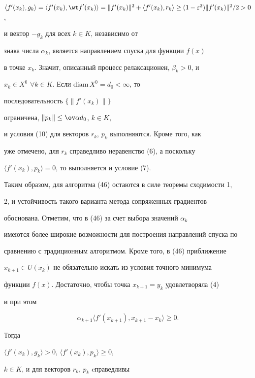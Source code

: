 $\langle {{f}'(x_k),g_k}\rangle =\langle {{f}'(x_k),{\wt f}'(x_k)}\rangle=


\|{{f}'(x_k)}\|^2+\langle {{f}'(x_k),r_k}\rangle\ge


(1-\varepsilon^2)\|{{f}'(x_k)}\|^2/2>0$,


и вектор $-g_k$ для всех $k\in K$, независимо от


знака числа $\alpha_k$, является направлением спуска для функции $f(x)$


в точке $x_k$. Значит, описанный процесс релаксационен, $\beta_k>0$, и


$x_k\in X^{0}$ $\forall k\in K$. Если $\mathrm{diam}\,X^{0}=d_0<\infty$, то


последовательность $\{{\|{{f}'(x_k)}\|}\}$


ограничена, $\|{p_k}\|\le\ov\alpha d_0$, $k\in K$,


и условия (10) для векторов $r_k$, $p_k$ выполняются. Кроме того, как


уже отмечено, для $r_k$ справедливо неравенство (6), а поскольку


$\langle {{f}'(x_k),p_k}\rangle =0$, то выполняется и условие (7).


Таким образом, для алгоритма (46) остаются в силе теоремы сходимости 1,


2, и устойчивость такого варианта метода сопряженных градиентов


обоснована. Отметим, что в (46) за счет выбора значений $\alpha_k$


имеются более широкие возможности для построения направлений спуска по


сравнению с традиционным алгоритмом. Кроме того, в (46) приближение


$x_{k+1}\in U(x_k)$ не обязательно искать из условия точного минимума


функции $f(x)$. Достаточно, чтобы точка $x_{k+1}=y_k$ удовлетворяла (4)


и при этом


\begin{equation}


\alpha_{k+1}\langle {{f}'(x_{k+1}),x_{k+1}-x_k}\rangle\ge 0.


\end{equation}


Тогда


$\langle{{f}'(x_k),g_k}\rangle>0$, $\langle{{f}'(x_k),p_k}\rangle\ge 0$,


$k\in K$, и для векторов $r_k$, $p_k$ cправедливы


